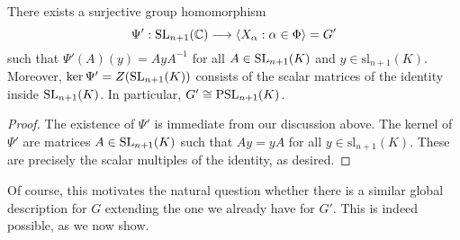 \begin{proposition}
    There exists a surjective group homomorphism 
    $$\Psi':\mathrm{SL}_{n+1}(\mathbb{C})\longrightarrow\langle X_\alpha:\alpha\in\Phi\rangle=G'$$
    such that $\Psi'(A)(y)=AyA^{-1}$ for all $A\in\mathrm{SL}_{n+1}(K)$ and $y\in\mathrm{sl}_{n+1}(K)$. Moreover, $\ker\Psi'=Z(\mathrm{SL}_{n+1}(K))$ consists of the scalar matrices of the identity inside $\mathrm{SL}_{n+1}(K)$. In particular, $G'\cong\mathrm{PSL}_{n+1}(K)$.
\end{proposition}
\begin{proof}
    The existence of $\Psi'$ is immediate from our discussion above. The kernel of $\Psi'$ are matrices $A\in\mathrm{SL}_{n+1}(K)$ such that $Ay=yA$ for all $y\in\mathrm{sl}_{n+1}(K)$. These are precisely the scalar multiples of the identity, as desired.
\end{proof}


Of course, this motivates the natural question whether there is a similar global description for $G$ extending the one we already have for $G'$. This is indeed possible, as we now show.

